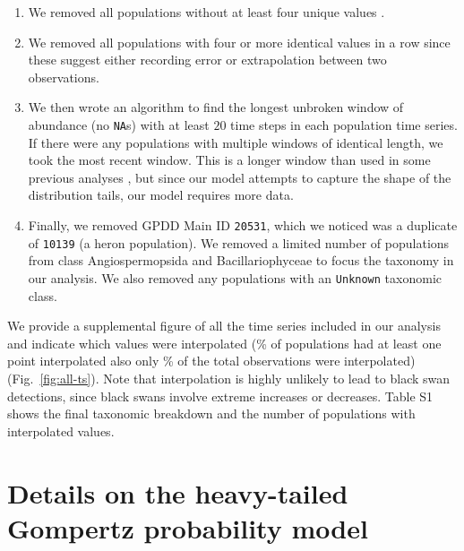 \begin{enumerate}
\item We removed all populations without at least four unique values \citep[following][]{brook2006a}.

\item We removed all populations with four or more identical values in a row since these suggest either recording error or extrapolation between two observations.

\item We then wrote an algorithm to find the longest unbroken window of abundance (no \texttt{NA}s) with at least $20$ time steps in each population time series. If there were any populations with multiple windows of identical length, we took the most recent window. This is a longer window than used in some previous analyses \citep[e.g.][]{brook2006a}, but since our model attempts to capture the shape of the distribution tails, our model requires more data.

\item Finally, we removed GPDD Main ID \texttt{20531}, which we noticed was a duplicate of \texttt{10139} (a heron population). We removed a limited number of populations from class Angiospermopsida and Bacillariophyceae to focus the taxonomy in our analysis. We also removed any populations with an \texttt{Unknown} taxonomic class.

\end{enumerate}

\noindent
We provide a supplemental figure of all the time series included in our analysis and indicate which values were interpolated (\percImputedPops\% of populations had at least one point interpolated also only \percImputedPoints\% of the total observations were interpolated) (Fig.~\ref{fig:all-ts}). Note that interpolation is highly unlikely to lead to black swan detections, since black swans involve extreme increases or decreases. Table S1 shows the final taxonomic breakdown and the number of populations with interpolated values.

\section{Details on the heavy-tailed Gompertz probability model}

